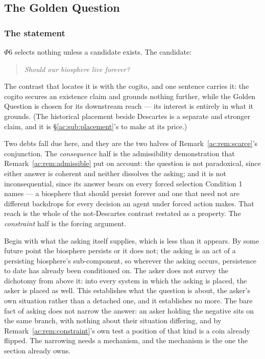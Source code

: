 \documentclass[11pt]{article}
\numberwithin{equation}{section}
\theoremstyle{plain}
\theoremstyle{definition}
\theoremstyle{remark}
\begin{document}
\subsection{The Golden Question}\label{ac:sub:question}

\subsubsection{The statement}\label{ac:ssub:statement}

$\Phi6$ selects nothing unless a candidate exists. The candidate:

\begin{quote}
    \emph{Should our biosphere live forever?}
\end{quote}

The contrast that locates it is with the cogito, and one sentence carries it: the cogito secures an existence claim and grounds nothing further, while the Golden Question is chosen for its downstream reach --- its interest is entirely in what it grounds. (The historical placement beside Descartes is a separate and stronger claim, and it is \S\ref{ac:sub:placement}'s to make at its price.)

Two debts fall due here, and they are the two halves of Remark~\ref{ac:rem:scarce}'s conjunction. The \emph{consequence} half is the admissibility demonstration that Remark~\ref{ac:rem:admissible} put on account: the question is not paradoxical, since either answer is coherent and neither dissolves the asking; and it is not inconsequential, since its answer bears on every forced selection Condition 1 names --- a biosphere that should persist forever and one that need not are different backdrops for every decision an agent under forced action makes. That reach is the whole of the not-Descartes contrast restated as a property. The \emph{constraint} half is the forcing argument.

Begin with what the asking itself supplies, which is less than it appears. By some future point the biosphere persists or it does not; the asking is an act of a persisting biosphere's sub-component, so wherever the asking occurs, persistence to date has already been conditioned on. The asker does not survey the dichotomy from above it: into every system in which the asking is placed, the asker is placed as well. This establishes what the question is about, the asker's own situation rather than a detached one, and it establishes no more. The bare fact of asking does not narrow the answer: an asker holding the negative sits on the same branch, with nothing about their situation differing, and by Remark~\ref{ac:rem:constraint}'s own test a position of that kind is a coin already flipped. The narrowing needs a mechanism, and the mechanism is the one the section already owns.
\end{document}
